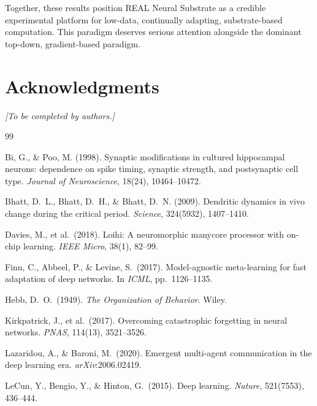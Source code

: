 \documentclass[10pt,twocolumn]{article}
\begin{document}
Together, these results position REAL Neural Substrate as a credible
experimental platform for low-data, continually adapting, substrate-based
computation. This paradigm deserves serious attention alongside the dominant top-down,
gradient-based paradigm.

\section*{Acknowledgments}
\textit{[To be completed by authors.]}

\begin{thebibliography}{99}

Bi, G., \& Poo, M. (1998).
Synaptic modifications in cultured hippocampal neurons: dependence on spike
timing, synaptic strength, and postsynaptic cell type.
\textit{Journal of Neuroscience}, 18(24), 10464--10472.

Bhatt, D.\ L., Bhatt, D.\ H., \& Bhatt, D.\ N. (2009).
Dendritic dynamics in vivo change during the critical period.
\textit{Science}, 324(5932), 1407--1410.

Davies, M., et al.\ (2018).
Loihi: A neuromorphic manycore processor with on-chip learning.
\textit{IEEE Micro}, 38(1), 82--99.

Finn, C., Abbeel, P., \& Levine, S.\ (2017).
Model-agnostic meta-learning for fast adaptation of deep networks.
In \textit{ICML}, pp.\ 1126--1135.

Hebb, D.\ O.\ (1949).
\textit{The Organization of Behavior}.
Wiley.

Kirkpatrick, J., et al.\ (2017).
Overcoming catastrophic forgetting in neural networks.
\textit{PNAS}, 114(13), 3521--3526.

Lazaridou, A., \& Baroni, M.\ (2020).
Emergent multi-agent communication in the deep learning era.
\textit{arXiv}:2006.02419.

LeCun, Y., Bengio, Y., \& Hinton, G.\ (2015).
Deep learning.
\textit{Nature}, 521(7553), 436--444.


\end{thebibliography}
\end{document}
